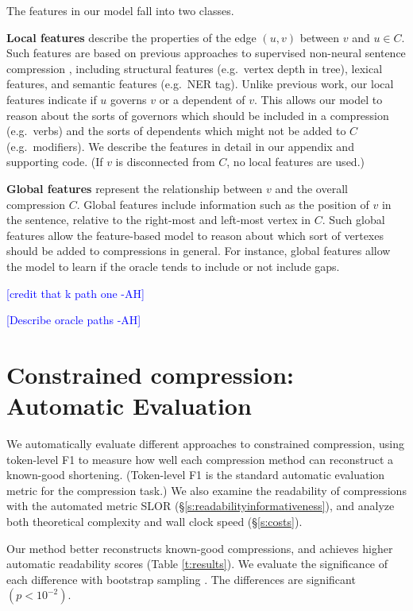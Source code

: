 \documentclass[11pt,a4paper]{article}
\newcommand{\ahcomment}[1]{\textcolor{blue}{[#1 -AH]}}
\begin{document}
The features in our model fall into two classes. 

\textbf{Local features} describe the properties of the edge $(u,v)$ between $v$ and $u \in C$. Such features are based on previous approaches to supervised non-neural sentence compression \cite{filippova2013overcoming,almeida2013fast,Filippova2015FastKS}, including structural features (e.g.~vertex depth in tree), lexical features, and semantic features (e.g.~NER tag). Unlike previous work, our local features indicate if $u$ governs $v$ or a dependent of $v$. This allows our model to reason about the sorts of governors which should be included in a compression (e.g.~verbs) and the sorts of dependents which might not be added to $C$ (e.g.~modifiers). We describe the features in detail in our appendix and supporting code. (If $v$ is disconnected from $C$, no local features are used.)  

\textbf{Global features} represent the relationship between $v$ and the overall compression $C$. Global features include information such as the position of $v$ in the sentence, relative to the right-most and left-most vertex in $C$. Such global features allow the feature-based model to reason about which sort of vertexes should be added to compressions in general. For instance, global features allow the model to learn if the oracle tends to include or not include gaps.

\ahcomment{credit that k path one}

\ahcomment{Describe oracle paths}

\section{Constrained compression: Automatic Evaluation}\label{s:autoeval}

We automatically evaluate different approaches to constrained compression, using token-level F1 to measure how well each compression method can reconstruct a known-good shortening. (Token-level F1 is the standard automatic evaluation metric for the compression task.) We also examine the readability of compressions with the automated metric SLOR (\S\ref{s:readabilityinformativeness}), and analyze both theoretical complexity and wall clock speed (\S\ref{s:costs}).

Our method better reconstructs known-good compressions, and achieves higher automatic readability scores (Table \ref{t:results}). We evaluate the significance of each difference with bootstrap sampling \cite{D12-1091}. The differences are significant {\small $(p < 10^{-2})$}. 
\end{document}
